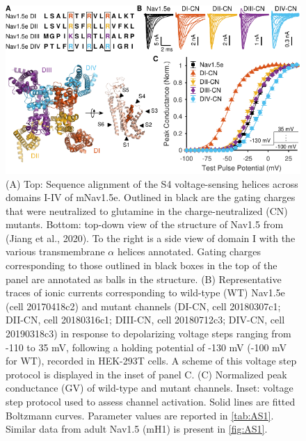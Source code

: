 \begin{figure}[t]
\centering
\includegraphics[width=115mm]{Figures/AppendixA/figure01.pdf}
\caption{
(A) Top: Sequence alignment of the S4 voltage-sensing helices across domains I-IV of mNav1.5e. Outlined in black are the gating charges that were neutralized to glutamine in the charge-neutralized (CN) mutants. Bottom: top-down view of the structure of Nav1.5 from (Jiang et al., 2020). To the right is a side view of domain I with the various transmembrane $\alpha$ helices annotated. Gating charges corresponding to those outlined in black boxes in the top of the panel are annotated as balls in the structure. 
(B) Representative traces of ionic currents corresponding to wild-type (WT) Nav1.5e (cell 20170418c2) and mutant channels (DI-CN, cell 20180307c1; DII-CN, cell 20180316c1; DIII-CN, cell 20180712c3; DIV-CN, cell 20190318c3) in response to depolarizing voltage steps ranging from -110 to 35 mV, following a holding potential of -130 mV (-100 mV for WT), recorded in HEK-293T cells. A scheme of this voltage step protocol is displayed in the inset of panel C. 
(C) Normalized peak conductance (GV) of wild-type and mutant channels. Inset: voltage step protocol used to assess channel activation. Solid lines are fitted Boltzmann curves. Parameter values are reported in \autoref{tab:AS1}. Similar data from adult Nav1.5 (mH1) is present in \autoref{fig:AS1}.}
\label{fig:A1}
\end{figure}


